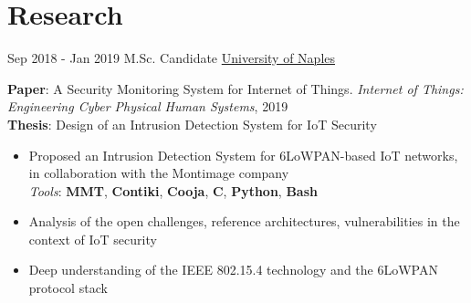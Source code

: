 \documentclass[letterpaper]{twentysecondcv} %
\begin{document}
\section{Research}
\begin{twenty}
	\twentyitem
    	{Sep 2018 -}
		{Jan 2019}
        {M.Sc. Candidate}
        {\href{http://www.scuolapsb.unina.it/}{University of Naples}}
        {}
        {
       	\textbf{Paper}: A Security Monitoring System for Internet of Things.  \textit{Internet of Things: Engineering Cyber Physical Human Systems}, 2019 \\
       	\textbf{Thesis}: Design of an Intrusion Detection System for IoT Security
        {
            \begin{itemize}
                \item Proposed an Intrusion Detection System for 6LoWPAN-based IoT networks, in collaboration with the Montimage company\\
                \textit{Tools}: \textbf{MMT}, \textbf{Contiki}, \textbf{Cooja}, \textbf{C}, \textbf{Python}, \textbf{Bash}
                \item Analysis of the open challenges, reference architectures, vulnerabilities in the context of IoT security
                \item Deep understanding of the IEEE 802.15.4 technology and the 6LoWPAN protocol stack
		    \end{itemize}}
        }
\end{twenty}
%
%
\end{document}
